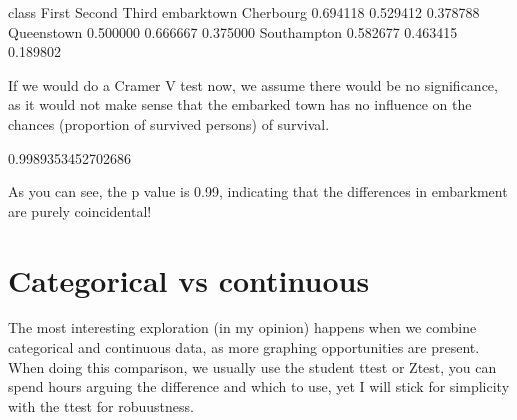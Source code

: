 \documentclass[letterpaper,10pt,english]{jupyterBook}
\begin{document}
\begin{sphinxVerbatim}[commandchars=\\\{\}]
  \PYG{p}{[} \PYG{p}{]}
\end{sphinxVerbatim}

\begin{sphinxVerbatim}[commandchars=\\\{\}]
class           First    Second     Third
embark\PYGZus{}town                              
Cherbourg    0.694118  0.529412  0.378788
Queenstown   0.500000  0.666667  0.375000
Southampton  0.582677  0.463415  0.189802
\end{sphinxVerbatim}

\sphinxAtStartPar
If we would do a Cramer V test now, we assume there would be no significance, as it would not make sense that the embarked town has no influence on the chances (proportion of survived persons) of survival.

\begin{sphinxVerbatim}[commandchars=\\\{\}]
      
\end{sphinxVerbatim}

\begin{sphinxVerbatim}[commandchars=\\\{\}]
0.9989353452702686
\end{sphinxVerbatim}

\sphinxAtStartPar
As you can see, the p value is 0.99, indicating that the differences in embarkment are purely coincidental!


\section{Categorical vs continuous}
\label{\detokenize{c5_data_exploration/bivariate_analysis:categorical-vs-continuous}}
\sphinxAtStartPar
The most interesting exploration (in my opinion) happens when we combine categorical and continuous data, as more graphing opportunities are present.
When doing this comparison, we usually use the student t\sphinxhyphen{}test or Z\sphinxhyphen{}test, you can spend hours arguing the difference and which to use, yet I will stick for simplicity with the t\sphinxhyphen{}test for robuustness.
\end{document}

